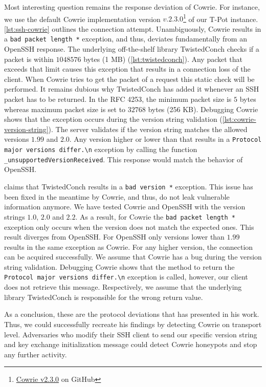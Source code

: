 Most interesting question remains the response deviation of Cowrie.
For instance, we use the default Cowrie implementation version $v.2.3.0$\footnote{\href{https://github.com/cowrie/cowrie/commit/555ff10d95f6239d9d6efee8a2d05def316ab144}{Cowrie v2.3.0} on GitHub} of our T-Pot instance.
\autoref{lst:ssh-cowrie} outlines the connection attempt.
Unambiguously, Cowrie results in a  \verb|bad packet length *| exception, and thus, deviates fundamentally from an Open\-SSH response.
The underlying off-the-shelf library TwistedConch checks if a packet is within $1048576$ bytes (1 MB) (\autoref{lst:twistedconch}).
Any packet that exceeds that limit causes this exception that results in a connection loss of the client.
When Cowrie tries to get the packet of a request this static check will be performed.
It remains dubious why TwistedConch has added it whenever an SSH packet has to be returned.
In the RFC 4253, the minimum packet size is $5$ bytes whereas maximum packet size is set to $32768$ bytes (256 KB).
Debugging Cowrie shows that the exception occurs during the version string validation (\autoref{lst:cowrie-version-string}).
The server validates if the version string matches the allowed versions $1.99$ and $2.0$.
Any version higher or lower than that results in a \verb|Protocol major versions differ.\n| exception by calling the function \verb|_unsupportedVersionReceived|.
This response would match the behavior of OpenSSH.

\citet{vetterl2020} claims that TwistedConch results in a \verb|bad version *| exception.
This issue has been fixed in the meantime by Cowrie, and thus, do not leak vulnerable information anymore.
We have tested Cowrie and OpenSSH with the version strings $1.0$, $2.0$ and $2.2$. 
As a result, for Cowrie the \verb|bad packet length *| exception only occurs when the version does not match the expected ones.
This result diverges from OpenSSH.
For OpenSSH only versions lower than $1.99$ results in the same exception as Cowrie.
For any higher version, the connection can be acquired successfully.
We assume that Cowrie has a bug during the version string validation.
Debugging Cowrie shows that the method to return the \verb|Protocol major versions differ.\n| exception is called, however, our client does not retrieve this message.
Respectively, we assume that the underlying library TwistedConch is responsible for the wrong return value.

As a conclusion, these are the protocol deviations that \citet{vetterl2020} has presented in his work.
Thus, we could successfully recreate his findings by detecting Cowrie on transport level.
Adversaries who modify their SSH client to send our specific version string and key exchange initialization message could detect Cowrie honeypots and stop any further activity.

